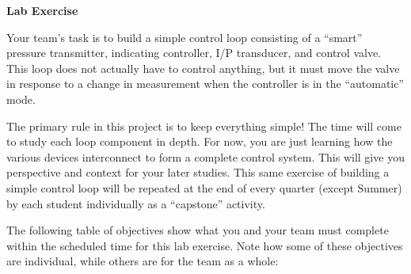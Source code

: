 

\noindent
{\bf Lab Exercise} 

\vskip 5pt

Your team's task is to build a simple control loop consisting of a ``smart'' pressure transmitter, indicating controller, I/P transducer, and control valve.  This loop does not actually have to control anything, but it must move the valve in response to a change in measurement when the controller is in the ``automatic'' mode.  

The primary rule in this project is to keep everything simple!  The time will come to study each loop component in depth.  For now, you are just learning how the various devices interconnect to form a complete control system.  This will give you perspective and context for your later studies.  This same exercise of building a simple control loop will be repeated at the end of every quarter (except Summer) by each student individually as a ``capstone'' activity.


The following table of objectives show what you and your team must complete within the scheduled time for this lab exercise.  Note how some of these objectives are individual, while others are for the team as a whole:

\vskip 10pt



